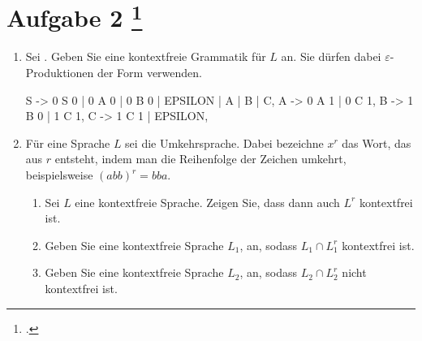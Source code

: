 \documentclass{lehramt-informatik-aufgabe}
\begin{document}
\section{Aufgabe 2
\footcite{66115:2020:09}}

\begin{enumerate}


\item Sei . Geben Sie eine kontextfreie Grammatik für $L$
an. Sie dürfen dabei $\varepsilon$-Produktionen der Form
 verwenden.

\begin{liAntwort}
\begin{liProduktionsRegeln}
S -> 0 S 0 | 0 A 0 | 0 B 0 | EPSILON | A | B | C,
A -> 0 A 1 | 0 C 1,
B -> 1 B 0 | 1 C 1,
C -> 1 C 1 | EPSILON,
\end{liProduktionsRegeln}
\end{liAntwort}


\item Für eine Sprache $L$ sei  die
Umkehrsprache. Dabei bezeichne $x^r$ das Wort, das aus $r$ entsteht,
indem man die Reihenfolge der Zeichen umkehrt, beispielsweise $(abb)^r =
bba$.

\begin{enumerate}


\item Sei $L$ eine kontextfreie Sprache. Zeigen Sie, dass dann auch
$L^r$ kontextfrei ist.


\item Geben Sie eine kontextfreie Sprache $L_1$, an, sodass $L_1 \cap
L^r_1$ kontextfrei ist.


\item Geben Sie eine kontextfreie Sprache $L_2$, an, sodass $L_2 \cap
L^r_2$ nicht kontextfrei ist.

\end{enumerate}
\end{enumerate}
\end{document}
